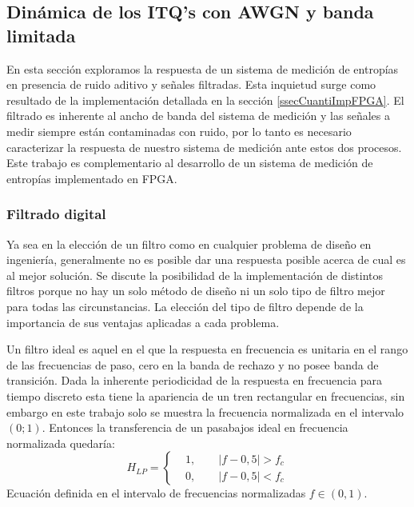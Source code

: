 \subsection{Dinámica de los ITQ's con AWGN y banda limitada}
\label{ssec:TDdS}
	
En esta sección exploramos la respuesta de un sistema de medición de entropías en presencia de ruido aditivo y señales filtradas.
Esta inquietud surge como resultado de la implementación detallada en la sección \ref{ssecCuantiImpFPGA}.
El filtrado es inherente al ancho de banda del sistema de medición y las señales a medir siempre están contaminadas con ruido, por lo tanto es necesario caracterizar la respuesta de nuestro sistema de medición ante estos dos procesos.
Este trabajo es complementario al desarrollo de un sistema de medición de entropías implementado en FPGA.

\subsubsection{Filtrado digital}
\label{sec:filtrado}

Ya sea en la elección de un filtro como en cualquier problema de diseño en ingeniería, generalmente no es posible dar una respuesta posible acerca de cual es al mejor solución. Se discute la posibilidad de la implementación de distintos filtros porque no hay un solo método de diseño ni un solo tipo de filtro mejor para todas las circunstancias. La elección del tipo de filtro depende de la importancia de sus ventajas aplicadas a cada problema.

Un filtro ideal es aquel en el que la respuesta en frecuencia es unitaria en el rango de las frecuencias de paso, cero en la banda de rechazo y no posee banda de transición. Dada la inherente periodicidad de la respuesta en frecuencia para tiempo discreto esta tiene la apariencia de un tren rectangular en frecuencias, sin embargo en este trabajo solo se muestra la frecuencia normalizada en el intervalo $(0;1)$. Entonces la transferencia de un pasabajos ideal en frecuencia normalizada quedaría:
\begin{equation}
H_{LP}=
\left\{ 
\begin{aligned}
&1,\qquad|f-0,5|>f_c\\
&0,\qquad|f-0,5|<f_c
\end{aligned}
\right.
\end{equation}
Ecuación definida en el intervalo de frecuencias normalizadas $f\in\left(0,1\right)$.

